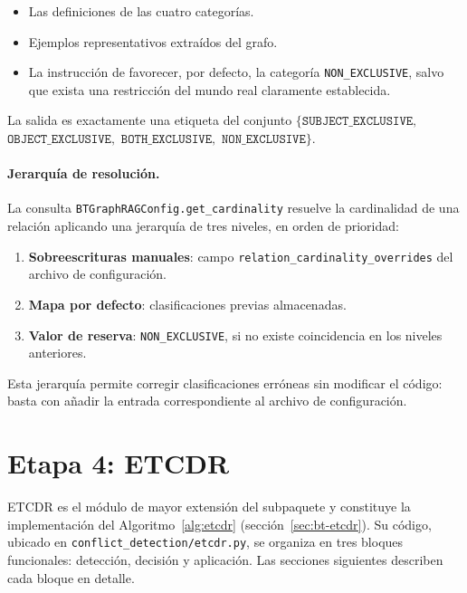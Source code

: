 \begin{itemize}
  \item Las definiciones de las cuatro categorías.
  \item Ejemplos representativos extraídos del grafo.
  \item La instrucción de favorecer, por defecto, la categoría \texttt{NON\_EXCLUSIVE}, salvo que exista una restricción del mundo real claramente establecida.
\end{itemize}

La salida es exactamente una etiqueta del conjunto $\{\texttt{SUBJECT\_EXCLUSIVE},$ $\texttt{OBJECT\_EXCLUSIVE},$ $\texttt{BOTH\_EXCLUSIVE},$ $\texttt{NON\_EXCLUSIVE}\}$.

\paragraph{Jerarquía de resolución.}
La consulta \texttt{BTGraphRAGConfig.get\_cardinality} resuelve la cardinalidad de una relación aplicando una jerarquía de tres niveles, en orden de prioridad:

\begin{enumerate}
  \item \textbf{Sobreescrituras manuales}: campo \texttt{relation\_cardinality\_overrides} del archivo de configuración.
  \item \textbf{Mapa por defecto}: clasificaciones previas almacenadas.
  \item \textbf{Valor de reserva}: \texttt{NON\_EXCLUSIVE}, si no existe coincidencia en los niveles anteriores.
\end{enumerate}

Esta jerarquía permite corregir clasificaciones erróneas sin modificar el código: basta con añadir la entrada correspondiente al archivo de configuración.

\section{Etapa 4: ETCDR}\label{sec:impl-etcdr}

ETCDR es el módulo de mayor extensión del subpaquete y constituye la implementación del Algoritmo~\ref{alg:etcdr} (sección~\ref{sec:bt-etcdr}). Su código, ubicado en \texttt{conflict\_detection/etcdr.py}, se organiza en tres bloques funcionales: detección, decisión y aplicación. Las secciones siguientes describen cada bloque en detalle.

